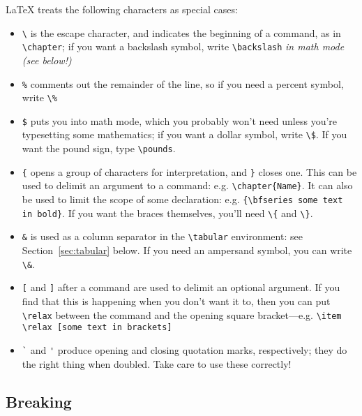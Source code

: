 \documentclass[dissertation]{softeng}
\begin{document}
{\LaTeX} treats the following characters as special cases: 
\begin{itemize}\raggedright
\item \verb|\| is the escape character, and indicates the beginning of
  a command, as in \verb|\chapter|; if you want a backslash symbol,
  write \verb|\backslash| \emph{in math mode (see below!)}
\item \verb|%| comments out the remainder of the line, so if you need
  a percent symbol, write \verb|\%|
\item \verb|$| puts you into math mode, which you probably won't need
  unless you're typesetting some mathematics; if you want a dollar
  symbol, write \verb|\$|.  If you want the pound sign, type
  \verb|\pounds|. 
\item \verb|{| opens a group of characters for interpretation, and
    \verb|}| closes one.  This can be used to delimit an argument to a
  command: e.g. \verb|\chapter{Name}|.  It can also be used to limit
  the scope of some declaration: e.g. 
  \verb|{\bfseries some text in bold}|.  
  If you want the braces themselves, you'll need \verb|\{|
  and \verb|\}|.
\item \verb|&| is used as a column separator in the \verb|\tabular|
  environment: see Section~\ref{sec:tabular} below.  If you need an
  ampersand symbol, you can write \verb|\&|. 
\item \verb|[| and \verb|]| after a command are used to delimit an
  optional argument.  If you find that this is happening when you
  don't want it to, then you can put \verb|\relax| between the command
  and the opening square bracket---e.g. 
  \verb|\item \relax [some text in brackets]|
\item \verb|`| and \verb|'| produce opening and closing quotation
  marks, respectively; they do the right thing when doubled.  Take
  care to use these correctly!
\end{itemize}

\subsection{Breaking}
\end{document}
